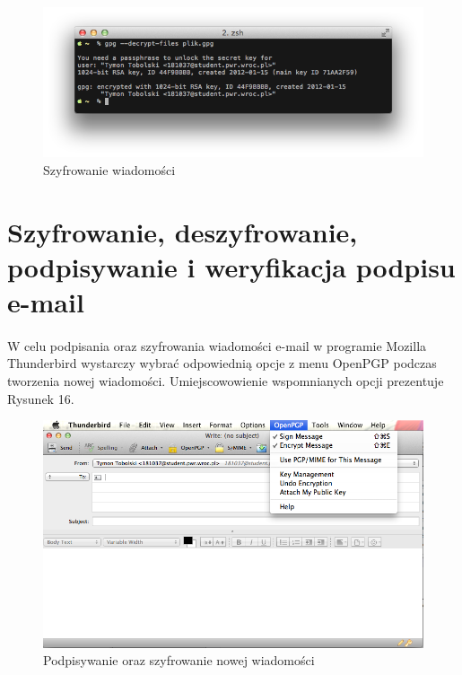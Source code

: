 \documentclass[wide,a4paper,titlepage,12pt] {article}
\begin{document}
  \begin{figure}[h!]
    \begin{center}
      \includegraphics[width=\textwidth]{img/15.png}
      \caption{Szyfrowanie wiadomości}
    \end{center}
  \end{figure}

  \section{Szyfrowanie, deszyfrowanie, podpisywanie i weryfikacja podpisu e-mail}
  \paragraph{}
  W celu podpisania oraz szyfrowania wiadomości e-mail w programie Mozilla Thunderbird wystarczy wybrać odpowiednią opcje z menu OpenPGP podczas tworzenia nowej wiadomości. Umiejscowowienie wspomnianych opcji prezentuje Rysunek 16.

  \begin{figure}[h!]
    \begin{center}
      \includegraphics[width=\textwidth]{img/16.png}
      \caption{Podpisywanie oraz szyfrowanie nowej wiadomości}
    \end{center}
  \end{figure}
\end{document}
